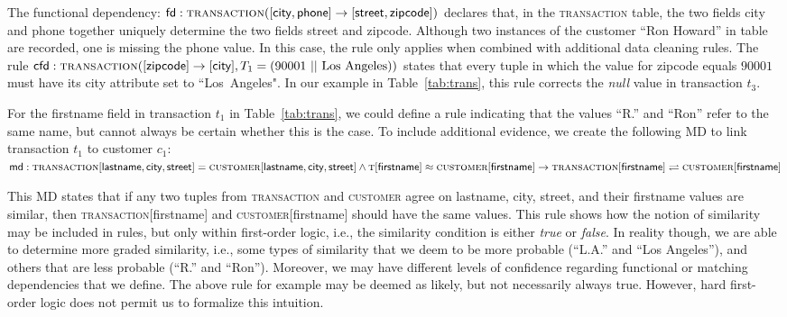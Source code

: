 The functional dependency: $\textsf{fd}: \textsc{transaction}([\textsf{city}, \textsf{phone}] \rightarrow [\textsf{street}, \textsf{zipcode}])$ declares that, in the \textsc{transaction} table, the two fields \textsf{city} and \textsf{phone} together 
uniquely determine the two fields \textsf{street} and \textsf{zipcode}. Although two instances of the customer ``Ron Howard'' in table~ are recorded, one is missing the \textsf{phone} value. In this case, the rule only applies when combined with additional data cleaning rules. The rule $\textsf{cfd}: \textsc{transaction}([\textsf{zipcode}] \rightarrow [\textsf{city}], T_1 =(90001~||~\text{Los~Angeles}))$ states that every tuple in which the value for \textsf{zipcode} equals $90001$ must have its \textsf{city} attribute set to ``Los~Angeles". In our example in Table~\ref{tab:trans}, this rule corrects the \emph{null} value in transaction $t_3$. 

For the \textsf{firstname} field in transaction $t_1$ in Table~\ref{tab:trans}, we could define a rule indicating that the values ``R.'' and ``Ron'' refer to the same name, but cannot always be certain whether this is the case. To include additional evidence, we create the following MD to link transaction $t_1$ 
to customer $c_1$: 
$ \textsf{md}: \textsc{transaction}[\textsf{lastname}, \textsf{city}, \textsf{street}]
= \textsc{customer}[\textsf{lastname}, \textsf{city}, \textsf{street}] \land \textsc{t}[\textsf{firstname}] \approx \textsc{customer}[\textsf{firstname}] 
 \rightarrow \textsc{transaction}[\textsf{firstname}] \rightleftharpoons \textsc{customer}[\textsf{firstname}]$


This MD states that if any two tuples from \textsc{transaction} and \textsc{customer}
agree on \textsf{lastname}, \textsf{city}, \textsf{street}, and their \textsf{firstname} values are similar, then \textsc{transaction}[\textsf{firstname}] and 
\textsc{customer}[\textsf{firstname}] should have the same values. This rule shows how the notion of similarity may be included in rules, but only within first-order logic, i.e., the similarity condition is either \emph{true} or \emph{false}. In reality though, we are able to determine more graded similarity, i.e., some types of similarity that we deem to be more probable (``L.A.'' and ``Los Angeles''), and others that are less probable (``R.'' and ``Ron''). Moreover, we may have different levels of confidence regarding functional or matching dependencies that we define. The above rule for example may be deemed as likely, but not necessarily always true. However, hard first-order logic does not permit us to formalize this intuition.

